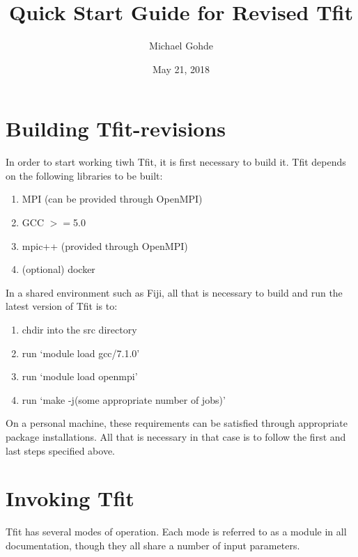 \documentclass[12pt,letterpaper]{article}
\begin{document}
\title{Quick Start Guide for Revised Tfit}
\author{Michael Gohde}
\date{May 21, 2018}
\maketitle


\section{Building Tfit-revisions}
In order to start working tiwh Tfit, it is first necessary to build it. Tfit depends on the following libraries to be built:

\begin{enumerate}
\item MPI (can be provided through OpenMPI)
\item GCC $>=$5.0
\item mpic++ (provided through OpenMPI)
\item (optional) docker
\end{enumerate}

In a shared environment such as Fiji, all that is necessary to build and run the latest version of Tfit is to:
\begin{enumerate}
\item chdir into the src directory
\item run `module load gcc/7.1.0'
\item run `module load openmpi'
\item run `make -j(some appropriate number of jobs)'
\end{enumerate}

On a personal machine, these requirements can be satisfied through appropriate package installations. All that is necessary in that case is to follow the first and last steps specified above.

\section{Invoking Tfit}
Tfit has several modes of operation. Each mode is referred to as a module in all documentation, though they all share a number of input parameters. 
\end{document}
